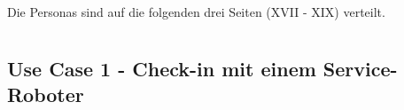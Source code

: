 \documentclass[
  ngerman           %
  ,twoside          %
  ,11pt
  ,pdftex
]{report}
\begin{document}
\chapter{}
\label{appendix:persona}
Die Personas sind auf die folgenden drei Seiten (XVII - XIX) verteilt. 
\begin{landscape}

\end{landscape}
\begin{landscape}

\end{landscape}
\begin{landscape}

\end{landscape}

\chapter{}
\label{appendix:user-story-uc1}
%
\section*{Use Case 1 - Check-in mit einem Service-Roboter}
\end{document}
